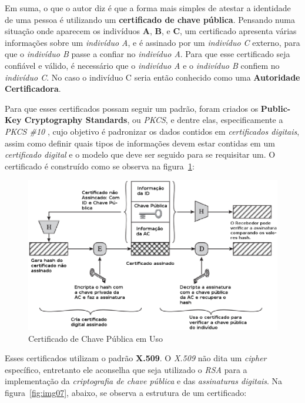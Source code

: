 	Em suma, o que o autor diz é que a forma mais simples de atestar a identidade de uma pessoa é utilizando um \textbf{certificado de chave pública}. Pensando numa situação onde aparecem os indivíduos \textbf{A}, \textbf{B}, e \textbf{C}, um certificado apresenta várias informações sobre um \textit{indivíduo A}, e é assinado por um \textit{indivíduo C} externo, para que o \textit{indivíduo B} passe a confiar no \textit{indivíduo A}. Para que esse certificado seja confiável e válido, é necessário que o \textit{indivíduo A} e o \textit{indivíduo B} confiem no \textit{indivíduo C}. No caso o indivíduo C seria então conhecido como uma \textbf{Autoridade Certificadora}.

	Para que esses certificados possam seguir um padrão, foram criados os \textbf{Public-Key Cryptography Standards}, ou \textit{PKCS}, e dentre elas, especificamente a \textit{PKCS \#10} \cite{pkcs10}, cujo objetivo é padronizar os dados contidos em \textit{certificados digitais}, assim como definir quais tipos de informações devem estar contidas em um \textit{certificado digital} e o modelo que deve ser seguido para se requisitar um. O certificado é construído como se observa na figura~\ref{fig:img06}:

	\begin{figure}[h]
		\centering
		\includegraphics[keepaspectratio=true,scale=0.46]{figuras/img05.eps}
		\caption{Certificado de Chave Pública em Uso \cite[p.~430]{stallings11}}
		\label{fig:img06}
	\end{figure}
 
	Esses certificados utilizam o padrão \textbf{X.509}. O \textit{X.509} não dita um \textit{cipher} específico, entretanto ele aconselha que seja utilizado o \textit{RSA} para a implementação da \textit{criptografia de chave pública} e das \textit{assinaturas digitais}. Na figura~\ref{fig:img07}, abaixo, se observa a estrutura de um certificado:

